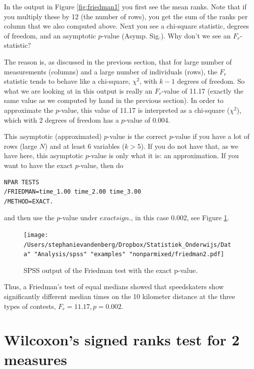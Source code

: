 \documentclass[]{book}\usepackage[]{graphicx}\usepackage[]{color}
\begin{document}
In the output in Figure \ref{fig:friedman1} you first see the mean ranks. Note that if you multiply these by 12 (the number of rows), you get the sum of the ranks per column that we also computed above. Next you see a chi-square statistic, degrees of freedom, and an asymptotic $p$-value (Asymp. Sig.). Why don't we see an $F_r$-statistic?

The reason is, as discussed in the previous section, that for large number of measurements (columns) and a large number of individuals (rows), the $F_r$ statistic tends to behave like a chi-square, $\chi^2$, with $k-1$ degrees of freedom. So what we are looking at in this output is really an $F_r$-value of 11.17 (exactly the same value as we computed by hand in the previous section). In order to approximate the $p$-value, this value of 11.17 is interpreted as a chi-square ($\chi^2$), which with 2 degrees of freedom has a $p$-value of 0.004.


This asymptotic (approximated) $p$-value is the correct $p$-value if you have a lot of rows (large $N$) and at least 6 variables ($k>5$). If you do not have that, as we have here, this asymptotic $p$-value is only what it is: an approximation. If you want to have the exact $p$-value, then do

\begin{verbatim}
NPAR TESTS
/FRIEDMAN=time_1.00 time_2.00 time_3.00
/METHOD=EXACT.
\end{verbatim}

and then use the $p$-value under $exact sign.$, in this case 0.002, see Figure \ref{fig:friedman2}.

\begin{figure}[h]
    \begin{center}
       \texttt{[image: /Users/stephanievandenberg/Dropbox/Statistiek\_Onderwijs/Data" "Analysis/spss" "examples" "nonparmixed/friedman2.pdf]}
    \end{center}
    \caption{SPSS output of the Friedman test with the exact p-value.}
    \label{fig:friedman2}
\end{figure}


Thus, a Friedman's test of equal medians showed that speedskaters show significantly different median times on the 10 kilometer distance at the three types of contests, $F_r=11.17, p=0.002$.



\section{Wilcoxon's signed ranks test for 2 measures}
\end{document}
